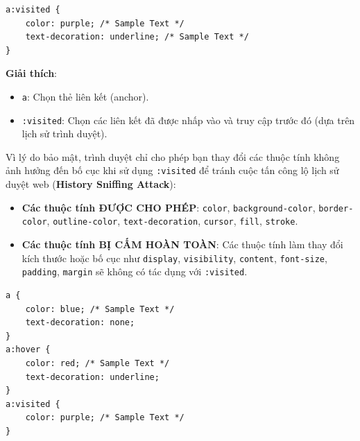 \documentclass[11pt,oneside]{book}
\newcommand{\codeinline}[1]{\textcolor{accentOrange}{\texttt{#1}}}
\newcommand{\term}[1]{\textbf{\textcolor{primaryBlue}{#1}}}
\begin{document}
\begin{conceptBox}
\begin{codeWindow}
\begin{lstlisting}[language=CSS3]
a:visited {
    color: purple; /* Sample Text */
    text-decoration: underline; /* Sample Text */
}
\end{lstlisting}
\end{codeWindow}
\textbf{Giải thích}:
\begin{itemize}[leftmargin=1.5em, itemsep=2pt, parsep=0pt]
    \item \codeinline{a}: Chọn thẻ liên kết (anchor).
    \item \codeinline{:visited}: Chọn các liên kết đã được nhấp vào và truy cập trước đó (dựa trên lịch sử trình duyệt).
\end{itemize}
\end{conceptBox}

\begin{warnBox}
Vì lý do bảo mật, trình duyệt chỉ cho phép bạn thay đổi các thuộc tính không ảnh hưởng đến bố cục khi sử dụng \codeinline{:visited} để tránh cuộc tấn công lộ lịch sử duyệt web (\term{History Sniffing Attack}):
\begin{itemize}[leftmargin=1.5em, itemsep=2pt, parsep=0pt]
    \item \textbf{Các thuộc tính ĐƯỢC CHO PHÉP}: \codeinline{color}, \codeinline{background-color}, \codeinline{border-color}, \codeinline{outline-color}, \codeinline{text-decoration}, \codeinline{cursor}, \codeinline{fill}, \codeinline{stroke}.
    \item \textbf{Các thuộc tính BỊ CẤM HOÀN TOÀN}: Các thuộc tính làm thay đổi kích thước hoặc bố cục như \codeinline{display}, \codeinline{visibility}, \codeinline{content}, \codeinline{font-size}, \codeinline{padding}, \codeinline{margin} sẽ không có tác dụng với \codeinline{:visited}.
\end{itemize}
\end{warnBox}

\begin{codeWindow}
\begin{lstlisting}[language=CSS3]
a {
    color: blue; /* Sample Text */
    text-decoration: none;
}
a:hover {
    color: red; /* Sample Text */
    text-decoration: underline;
}
a:visited {
    color: purple; /* Sample Text */
}
\end{lstlisting}
\end{codeWindow}
\end{document}
